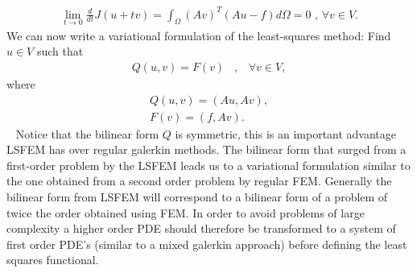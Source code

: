 \begin{align}
	\lim_{t\rightarrow 0} \frac{d}{dt}J(u+tv) = \int_{\Omega}(Av)^T(Au-f)d\Omega = 0 \text{    ,   } \forall v \in V.
	\label{eq:minProb}
\end{align}
We can now write a variational formulation of the least-squares method: Find $u \in V$ such that 
\begin{align}
	Q(u,v) = F(v) \; \; \; , \; \; \; \forall v \in V,
	\label{def:varForm}
\end{align}
where
\begin{align}
	Q(u,v) = (Au,Av), \\
	F(v) = (f,Av).
	\label{def:bilin}
\end{align}
~\cite{Jiang}
Notice that the bilinear form $Q$ is symmetric, this is an important advantage LSFEM has over regular galerkin methods. The bilinear form that surged from a first-order problem by the LSFEM leads us to a variational formulation similar to the one obtained from a second order problem by regular FEM. Generally the bilinear form from LSFEM will correspond to a bilinear form of a problem of twice the order obtained using FEM. In order to avoid problems of large complexity a higher order PDE should therefore be transformed to a system of first order PDE's (similar to a mixed galerkin approach) before defining the least squares functional.


\cite{Jiang}

